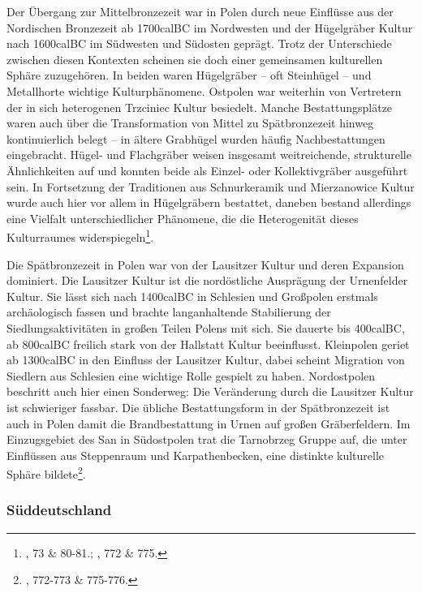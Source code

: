 \documentclass[openany,twoside,twocolumn]{book}
\let\rmarkdownfootnote\footnote%
\def\footnote{\protect\rmarkdownfootnote}
\begin{document}
Der Übergang zur Mittelbronzezeit war in Polen durch neue Einflüsse aus
der Nordischen Bronzezeit ab 1700calBC im Nordwesten und der Hügelgräber
Kultur nach 1600calBC im Südwesten und Südosten geprägt. Trotz der
Unterschiede zwischen diesen Kontexten scheinen sie doch einer
gemeinsamen kulturellen Sphäre zuzugehören. In beiden waren Hügelgräber
-- oft Steinhügel -- und Metallhorte wichtige Kulturphänomene. Ostpolen
war weiterhin von Vertretern der in sich heterogenen Trzciniec Kultur
besiedelt. Manche Bestattungsplätze waren auch über die Transformation
von Mittel zu Spätbronzezeit hinweg kontinuierlich belegt -- in ältere
Grabhügel wurden häufig Nachbestattungen eingebracht. Hügel- und
Flachgräber weisen insgesamt weitreichende, strukturelle Ähnlichkeiten
auf und konnten beide als Einzel- oder Kollektivgräber ausgeführt sein.
In Fortsetzung der Traditionen aus Schnurkeramik und Mierzanowice Kultur
wurde auch hier vor allem in Hügelgräbern bestattet, daneben bestand
allerdings eine Vielfalt unterschiedlicher Phänomene, die die
Heterogenität dieses Kulturraumes widerspiegeln\footnote{\textcite{dabrowski_aeltere_2004},
  73 \& 80-81.; \textcite{czebreszuk_bronze_2013}, 772 \& 775.}.

Die Spätbronzezeit in Polen war von der Lausitzer Kultur und deren
Expansion dominiert. Die Lausitzer Kultur ist die nordöstliche
Ausprägung der Urnenfelder Kultur. Sie lässt sich nach 1400calBC in
Schlesien und Großpolen erstmals archäologisch fassen und brachte
langanhaltende Stabilierung der Siedlungsaktivitäten in großen Teilen
Polens mit sich. Sie dauerte bis 400calBC, ab 800calBC freilich stark
von der Hallstatt Kultur beeinflusst. Kleinpolen geriet ab 1300calBC in
den Einfluss der Lausitzer Kultur, dabei scheint Migration von Siedlern
aus Schlesien eine wichtige Rolle gespielt zu haben. Nordostpolen
beschritt auch hier einen Sonderweg: Die Veränderung durch die Lausitzer
Kultur ist schwieriger fassbar. Die übliche Bestattungsform in der
Spätbronzezeit ist auch in Polen damit die Brandbestattung in Urnen auf
großen Gräberfeldern. Im Einzugsgebiet des San in Südostpolen trat die
Tarnobrzeg Gruppe auf, die unter Einflüssen aus Steppenraum und
Karpathenbecken, eine distinkte kulturelle Sphäre bildete\footnote{\textcite{czebreszuk_bronze_2013},
  772-773 \& 775-776.}.

\hypertarget{suddeutschland}{%
\subsubsection{Süddeutschland}\label{suddeutschland}}
\end{document}
